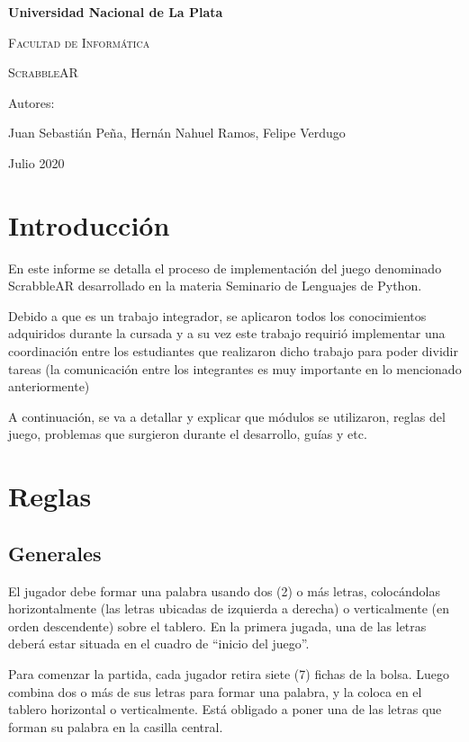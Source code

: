 \documentclass[12pt]{article}
\begin{document}
	
\begin{titlepage}
\centering
{\bfseries\LARGE Universidad Nacional de La Plata \par}
\vspace{1cm}
{\scshape\Large Facultad de Informática \par}
\vspace{3cm}
{\scshape\Huge ScrabbleAR \par}
\vfill
{\Large Autores: \par}
{\Large Juan Sebastián Peña,  Hernán Nahuel Ramos, Felipe Verdugo \par}
\vfill
{\Large Julio 2020 \par}
\end{titlepage}




\tableofcontents

\section{Introducción}

En este informe se detalla el proceso de implementación del juego denominado ScrabbleAR desarrollado en la materia Seminario de Lenguajes de Python.

Debido a que es un trabajo integrador, se aplicaron todos los conocimientos adquiridos durante la cursada y a su vez este trabajo requirió implementar una coordinación entre los estudiantes que realizaron dicho trabajo para poder dividir tareas (la comunicación entre los integrantes es muy importante en lo mencionado anteriormente)

A continuación, se va a detallar y explicar que módulos se utilizaron, reglas del juego, problemas que surgieron durante el desarrollo, guías y etc.


\section{Reglas}
\label{sec:reglas}
\subsection{Generales}
El jugador debe formar una palabra usando dos (2) o más letras, colocándolas horizontalmente (las letras ubicadas de izquierda a derecha) o verticalmente (en orden descendente) sobre el tablero. En la primera jugada, una de las letras deberá estar situada en el cuadro de “inicio del juego”.

Para comenzar la partida, cada jugador retira siete (7) fichas de la bolsa. Luego combina dos o más de sus letras para formar una palabra, y la coloca en el tablero horizontal o verticalmente. Está obligado a poner una de las letras que forman su palabra en la casilla central.
\end{document}
